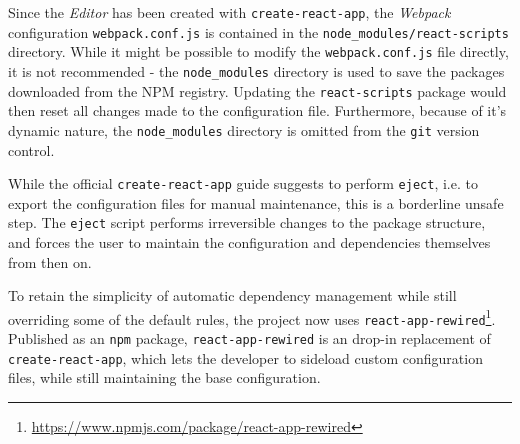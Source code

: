 Since the \textit{Editor} has been created with \texttt{create-react-app}, the \textit{Webpack} configuration \texttt{webpack.conf.js} is contained in the \verb|node_modules/react-scripts| directory.
While it might be possible to modify the \texttt{webpack.conf.js} file directly, it is not recommended - the \verb|node_modules| directory is used to save the packages downloaded from the NPM registry.
Updating the \texttt{react-scripts} package would then reset all changes made to the configuration file.
Furthermore, because of it's dynamic nature, the \verb|node_modules| directory is omitted from the \texttt{git} version control.

While the official \texttt{create-react-app} guide suggests to perform \texttt{eject}, i.e. to export the configuration files for manual maintenance, this is a borderline unsafe step. 
The \texttt{eject} script performs irreversible changes to the package structure, and forces the user to maintain the configuration and dependencies themselves from then on.

To retain the simplicity of automatic dependency management while still overriding some of the default rules, the project now uses \texttt{react-app-rewired}\footnote{\url{https://www.npmjs.com/package/react-app-rewired}}.
Published as an \texttt{npm} package, \texttt{react-app-rewired} is an drop-in replacement of \texttt{create-react-app}, which lets the developer to sideload custom configuration files, while still maintaining the base configuration.




